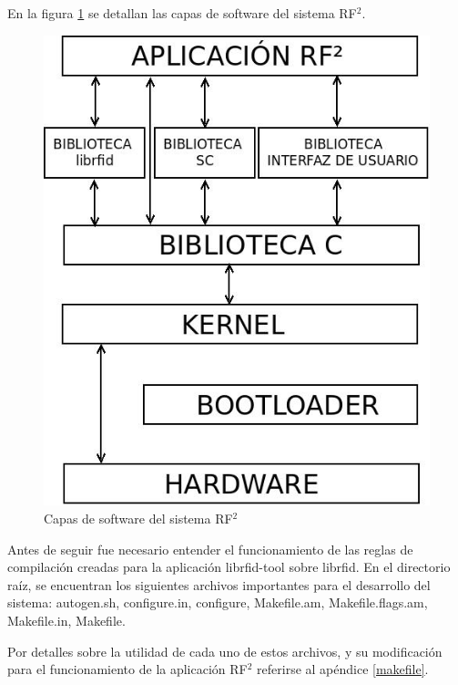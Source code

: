 En la figura \ref{Fig:SW} se detallan las capas de software del sistema RF$^{2}$.

\begin{figure}[H]
\centering
  \begin{center}
  \includegraphics[scale=.35]{Imagenes/SW.jpg} 
  \end{center}
  \caption{Capas de software del sistema RF${^{2}}$}\label{Fig:SW} 
\end{figure}

\bigskip
Antes de seguir fue necesario entender el funcionamiento de las reglas de compilación creadas para la aplicación librfid-tool sobre librfid. En el directorio raíz, se encuentran los siguientes archivos importantes para el desarrollo del sistema: autogen.sh, configure.in, configure, Makefile.am, Makefile.flags.am, Makefile.in, Makefile.

\bigskip
Por detalles sobre la utilidad de cada uno de estos archivos, y su modificación para el funcionamiento de la aplicación RF$ ^{2} $ referirse al apéndice \ref{makefile}.

\bigskip
{}

